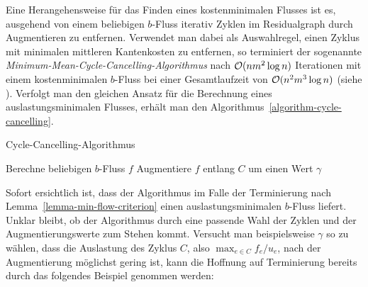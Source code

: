 Eine Herangehensweise für das Finden eines kostenminimalen Flusses ist es, ausgehend von einem beliebigen $b$-Fluss iterativ Zyklen im Residualgraph durch Augmentieren zu entfernen.
Verwendet man dabei als Auswahlregel, einen Zyklus mit minimalen mittleren Kantenkosten zu entfernen, so terminiert der sogenannte \emph{Minimum-Mean-Cycle-Cancelling-Algorithmus} nach $\mathcal{O}(nm^2\log n)$ Iterationen mit einem kostenminimalen $b$-Fluss bei einer Gesamtlaufzeit von $\mathcal{O}(n^2m^3 \log n)$ (siehe \cite[Theoreme~3.9, 3.10]{Goldberg1989}).
Verfolgt man den gleichen Ansatz für die Berechnung eines auslastungsminimalen Flusses, erhält man den Algorithmus~\ref{algorithm-cycle-cancelling}.
\begin{algorithm}
	\caption{Cycle-Cancelling-Algorithmus}
	\label{algorithm-cycle-cancelling}
	\begin{algorithmic}[1]
		\State Berechne beliebigen $b$-Fluss $f$
			\State Augmentiere $f$ entlang $C$ um einen Wert $\gamma$
		\EndWhile
		\EndProcedure
	\end{algorithmic}
\end{algorithm}

Sofort ersichtlich ist, dass der Algorithmus im Falle der Terminierung nach Lemma~\ref{lemma-min-flow-criterion} einen auslastungsminimalen $b$-Fluss liefert.
Unklar bleibt, ob der Algorithmus durch eine passende Wahl der Zyklen und der Augmentierungswerte zum Stehen kommt.
Versucht man beispielsweise $\gamma$ so zu wählen, dass die Auslastung des Zyklus $C$, also $\max_{e\in C} f_e / u_e$, nach der Augmentierung möglichst gering ist, kann die Hoffnung auf Terminierung bereits durch das folgendes Beispiel genommen werden:

